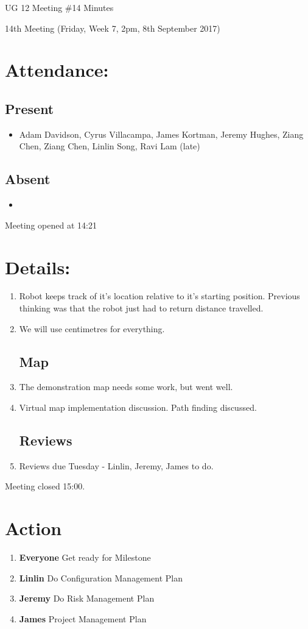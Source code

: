 \documentclass{article}
\begin{document}
\begin{adjustwidth}{2.5em}{0pt}
\begin{center}
\Large{UG 12 Meeting \#14 Minutes}\\
\end{center}
\end{adjustwidth}


14th Meeting (Friday, Week 7, 2pm, 8th September 2017)
\section{Attendance:}
\subsection*{Present}
\begin{itemize}
\item Adam Davidson, Cyrus Villacampa, James Kortman, Jeremy Hughes, Ziang Chen, Ziang Chen, Linlin Song, Ravi Lam (late)
\end{itemize}
\subsection*{Absent}
\begin{itemize}
\item  
\end {itemize}

Meeting opened at 14:21
\section{Details:}
\begin{enumerate}
\subsection{Sensor Data}
\item Robot keeps track of it's location relative to it's starting position. Previous thinking was that the robot just had to return distance travelled.
\item We will use centimetres for everything.
\subsection {Map}
\item The demonstration map needs some work, but went well.
\item Virtual map implementation discussion. Path finding discussed.
\subsection{Reviews}
\item Reviews due Tuesday - Linlin, Jeremy, James to do.

\end{enumerate}

Meeting closed 15:00.

\section{Action}
\begin{enumerate}
\item \textbf{Everyone} Get ready for Milestone
\item \textbf{Linlin} Do Configuration Management Plan
\item \textbf{Jeremy} Do Risk Management Plan
\item \textbf{James} Project Management Plan
\end{enumerate}
\end{document}
